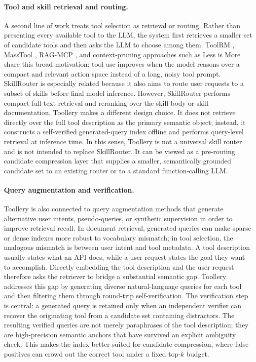 \paragraph{Tool and skill retrieval and routing.}
A second line of work treats tool selection as retrieval or routing. Rather than presenting every available tool to the LLM, the system first retrieves a smaller set of candidate tools and then asks the LLM to choose among them. ToolRM \citep{agarwal2025toolrm}, MassTool \citep{lin2025masstool}, RAG-MCP \citep{gan2025rag}, and context-pruning approaches such as Less is More \citep{paramanayakam2025less} share this broad motivation: tool use improves when the model reasons over a compact and relevant action space instead of a long, noisy tool prompt. SkillRouter is especially related because it also aims to route user requests to a subset of skills before final model inference. However, SkillRouter performs compact full-text retrieval and reranking over the skill body or skill documentation. Toollery makes a different design choice. It does not retrieve directly over the full tool description as the primary semantic object; instead, it constructs a self-verified generated-query index offline and performs query-level retrieval at inference time. In this sense, Toollery is not a universal skill router and is not intended to replace SkillRouter. It can be viewed as a pre-routing candidate compression layer that supplies a smaller, semantically grounded candidate set to an existing router or to a standard function-calling LLM.

\paragraph{Query augmentation and verification.}
Toollery is also connected to query augmentation methods that generate alternative user intents, pseudo-queries, or synthetic supervision in order to improve retrieval recall. In document retrieval, generated queries can make sparse or dense indexes more robust to vocabulary mismatch; in tool selection, the analogous mismatch is between user intent and tool metadata. A tool description usually states what an API does, while a user request states the goal they want to accomplish. Directly embedding the tool description and the user request therefore asks the retriever to bridge a substantial semantic gap. Toollery addresses this gap by generating diverse natural-language queries for each tool and then filtering them through round-trip self-verification. The verification step is central: a generated query is retained only when an independent verifier can recover the originating tool from a candidate set containing distractors. The resulting verified queries are not merely paraphrases of the tool description; they are high-precision semantic anchors that have survived an explicit ambiguity check. This makes the index better suited for candidate compression, where false positives can crowd out the correct tool under a fixed top-$k$ budget.

